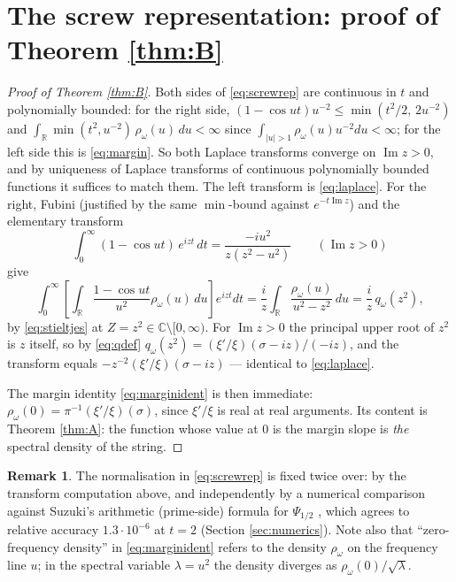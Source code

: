 \documentclass[11pt,reqno]{amsart}
\theoremstyle{plain}
\theoremstyle{definition}
\newtheorem{remark}[theorem]{Remark}
\newcommand{\R}{\mathbb{R}}
\newcommand{\C}{\mathbb{C}}
\newcommand{\Ip}{\operatorname{Im}}
\begin{document}
\section{The screw representation: proof of Theorem \ref{thm:B}}\label{sec:thmB}

\begin{proof}[Proof of Theorem \ref{thm:B}]
Both sides of \eqref{eq:screwrep} are continuous in $t$ and polynomially bounded: for the right
side, $(1-\cos ut)u^{-2}\le\min(t^2/2,\,2u^{-2})$ and
$\int_\R\min(t^2,u^{-2})\,\rho_\omega(u)\,du<\infty$ since
$\int_{|u|>1}\rho_\omega(u)u^{-2}du<\infty$; for the left side this is \eqref{eq:margin}. So
both Laplace transforms converge on $\Ip z>0$, and by uniqueness of Laplace transforms of
continuous polynomially bounded functions it suffices to match them. The left transform is
\eqref{eq:laplace}. For the right, Fubini (justified by the same $\min$-bound against
$e^{-t\Ip z}$) and the elementary transform
\[
  \int_0^\infty(1-\cos ut)\,e^{izt}\,dt=\frac{-iu^2}{z(z^2-u^2)}\qquad(\Ip z>0)
\]
give
\[
  \int_0^\infty\!\!\left[\int_\R\frac{1-\cos ut}{u^2}\rho_\omega(u)\,du\right]e^{izt}dt
  =\frac iz\int_\R\frac{\rho_\omega(u)}{u^2-z^2}\,du
  =\frac iz\,q_\omega(z^2),
\]
by \eqref{eq:stieltjes} at $Z=z^2\in\C\setminus[0,\infty)$. For $\Ip z>0$ the principal upper
root of $z^2$ is $z$ itself, so by \eqref{eq:qdef}
$q_\omega(z^2)=(\xi'/\xi)(\sigma-iz)/(-iz)$, and the transform equals
$-z^{-2}(\xi'/\xi)(\sigma-iz)$ --- identical to \eqref{eq:laplace}.

The margin identity \eqref{eq:marginident} is then immediate: $\rho_\omega(0)=
\pi^{-1}(\xi'/\xi)(\sigma)$, since $\xi'/\xi$ is real at real arguments. Its content is
Theorem \ref{thm:A}: the function whose value at $0$ is the margin slope is \emph{the} spectral
density of the string.
\end{proof}

\begin{remark}
The normalisation in \eqref{eq:screwrep} is fixed twice over: by the transform computation
above, and independently by a numerical comparison against Suzuki's arithmetic (prime-side)
formula for $\Psi_{1/2}$ \cite[\S11]{Suzuki2023}, which agrees to relative accuracy
$1.3\cdot10^{-6}$ at $t=2$ (Section \ref{sec:numerics}). Note also that ``zero-frequency
density'' in \eqref{eq:marginident} refers to the density $\rho_\omega$ on the frequency line
$u$; in the spectral variable $\lambda=u^2$ the density diverges as
$\rho_\omega(0)/\sqrt\lambda$.
\end{remark}
\end{document}
